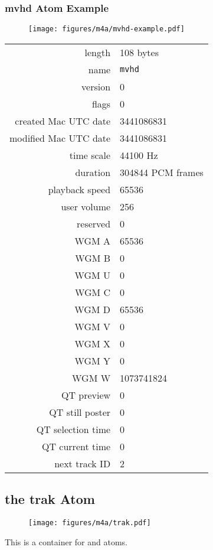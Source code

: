 \subsubsection{mvhd Atom Example}
\begin{figure}[h]
  \texttt{[image: figures/m4a/mvhd-example.pdf]}
\end{figure}
\par
\noindent
\begin{tabular}{rl}
  \textsf{length} & 108 bytes \\
  \textsf{name} & \texttt{mvhd} \\
  \textsf{version} & 0 \\
  \textsf{flags} & 0 \\
  \textsf{created Mac UTC date} & 3441086831 \\
  \textsf{modified Mac UTC date} & 3441086831 \\
  \textsf{time scale} & 44100 Hz \\
  \textsf{duration} & 304844 PCM frames \\
  \textsf{playback speed} & 65536 \\
  \textsf{user volume} & 256 \\
  \textsf{reserved} & 0 \\
  \textsf{WGM A} & 65536 \\
  \textsf{WGM B} & 0 \\
  \textsf{WGM U} & 0 \\
  \textsf{WGM C} & 0 \\
  \textsf{WGM D} & 65536 \\
  \textsf{WGM V} & 0 \\
  \textsf{WGM X} & 0 \\
  \textsf{WGM Y} & 0 \\
  \textsf{WGM W} & 1073741824 \\
  \textsf{QT preview} & 0 \\
  \textsf{QT still poster} & 0 \\
  \textsf{QT selection time} & 0 \\
  \textsf{QT current time} & 0 \\
  \textsf{next track ID} & 2 \\
\end{tabular}

\clearpage

\subsection{the trak Atom}
\label{atom:trak}
\begin{figure}[h]
  \texttt{[image: figures/m4a/trak.pdf]}
\end{figure}
\par
\noindent
This is a container for \hyperref[atom:tkhd]{} and
\hyperref[atom:mdia]{} atoms.

